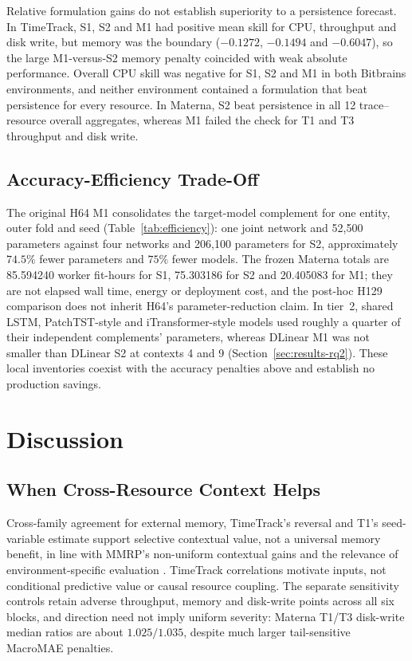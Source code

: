 Relative formulation gains do not establish superiority to a persistence
forecast. In TimeTrack, S1, S2 and M1 had positive mean skill for CPU,
throughput and disk write, but memory was the boundary ($-0.1272$, $-0.1494$
and $-0.6047$), so the large M1-versus-S2 memory penalty coincided with weak
absolute performance. Overall CPU skill was negative for S1, S2 and M1 in both
Bitbrains environments, and neither environment contained a formulation that
beat persistence for every resource. In Materna, S2 beat persistence in all 12
trace--resource overall aggregates, whereas M1 failed the check for T1 and T3
throughput and disk write.

\subsection{Accuracy-Efficiency Trade-Off}
\label{sec:results-efficiency}

The original H64 M1 consolidates the target-model complement for one entity,
outer fold and seed (Table~\ref{tab:efficiency}): one joint network and
52,500 parameters against four networks and 206,100 parameters for S2,
approximately $74.5\%$ fewer parameters and $75\%$ fewer models. The frozen
Materna totals are 85.594240 worker fit-hours for S1, 75.303186 for S2 and
20.405083 for M1; they are not elapsed wall time, energy or deployment cost,
and the post-hoc H129 comparison does not inherit H64's parameter-reduction
claim. In tier~2, shared LSTM, PatchTST-style and iTransformer-style models
used roughly a quarter of their independent complements' parameters, whereas
DLinear M1 was not smaller than DLinear S2 at contexts 4 and 9
(Section~\ref{sec:results-rq2}). These local inventories coexist with the
accuracy penalties above and establish no production savings.

\section{Discussion}
\label{sec:discussion}

\subsection{When Cross-Resource Context Helps}
\label{sec:discussion-context}

Cross-family agreement for external memory, TimeTrack's reversal and T1's
seed-variable estimate support selective contextual value, not a universal
memory benefit, in line with MMRP's non-uniform contextual gains
\citep{Tripathi2025MMRP} and the relevance of environment-specific evaluation
\citep{Rossi2025CloudUncertainty}. TimeTrack correlations
\citep{Meliani2025TimeTrack} motivate inputs, not conditional predictive value
or causal resource coupling.
The separate sensitivity controls retain adverse throughput, memory and
disk-write points across all six blocks, and direction need not imply uniform
severity: Materna T1/T3 disk-write median ratios are about $1.025/1.035$,
despite much larger tail-sensitive MacroMAE penalties.

